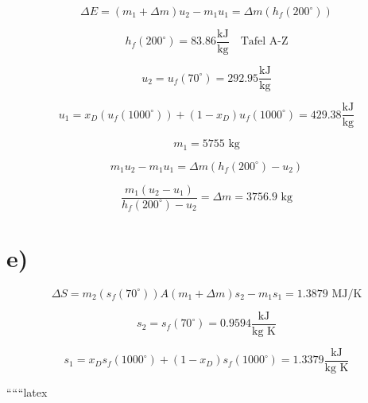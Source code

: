 \[
\Delta E = (m_1 + \Delta m) u_2 - m_1 u_1 = \Delta m \left( h_f \left( 200^\circ \right) \right)
\]

\[
h_f \left( 200^\circ \right) = 83.86 \frac{\text{kJ}}{\text{kg}} \quad \text{Tafel A-Z}
\]

\[
u_2 = u_f \left( 70^\circ \right) = 292.95 \frac{\text{kJ}}{\text{kg}}
\]

\[
u_1 = x_D \left( u_f \left( 1000^\circ \right) \right) + (1 - x_D) u_f \left( 1000^\circ \right) = 429.38 \frac{\text{kJ}}{\text{kg}}
\]

\[
m_1 = 5755 \text{ kg}
\]

\[
m_1 u_2 - m_1 u_1 = \Delta m \left( h_f \left( 200^\circ \right) - u_2 \right)
\]

\[
\frac{m_1 (u_2 - u_1)}{h_f \left( 200^\circ \right) - u_2} = \Delta m = 3756.9 \text{ kg}
\]

\section*{e)}

\[
\Delta S = m_2 \left( s_f \left( 70^\circ \right) \right) A (m_1 + \Delta m) s_2 - m_1 s_1 = 1.3879 \text{ MJ/K}
\]

\[
s_2 = s_f \left( 70^\circ \right) = 0.9594 \frac{\text{kJ}}{\text{kg K}}
\]

\[
s_1 = x_D s_f \left( 1000^\circ \right) + (1 - x_D) s_f \left( 1000^\circ \right) = 1.3379 \frac{\text{kJ}}{\text{kg K}}
\]

``````latex


